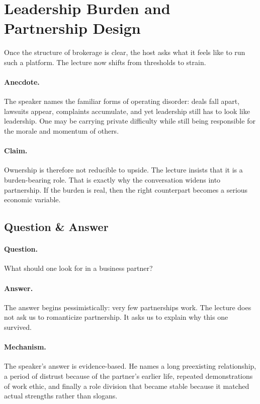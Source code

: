 \section{Leadership Burden and Partnership Design}

Once the structure of brokerage is clear, the host asks what it feels like to run such a platform. The lecture now shifts from thresholds to strain.

\paragraph{Anecdote.}
The speaker names the familiar forms of operating disorder: deals fall apart, lawsuits appear, complaints accumulate, and yet leadership still has to look like leadership. One may be carrying private difficulty while still being responsible for the morale and momentum of others.

\paragraph{Claim.}
Ownership is therefore not reducible to upside. The lecture insists that it is a burden-bearing role. That is exactly why the conversation widens into partnership. If the burden is real, then the right counterpart becomes a serious economic variable.

\subsection{Question \& Answer}

\paragraph{Question.}
What should one look for in a business partner?

\paragraph{Answer.}
The answer begins pessimistically: very few partnerships work. The lecture does not ask us to romanticize partnership. It asks us to explain why this one survived.

\paragraph{Mechanism.}
The speaker's answer is evidence-based. He names a long preexisting relationship, a period of distrust because of the partner's earlier life, repeated demonstrations of work ethic, and finally a role division that became stable because it matched actual strengths rather than slogans.

